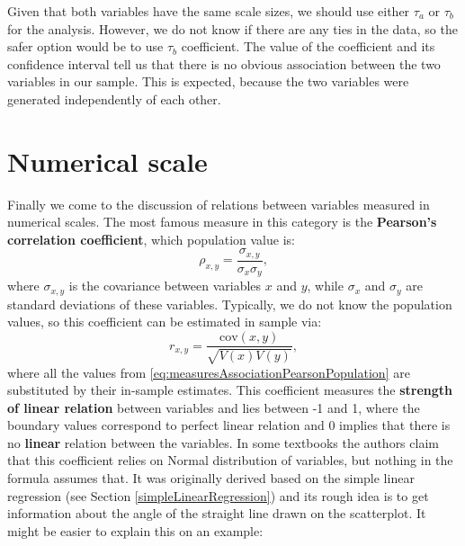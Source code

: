 \documentclass[
]{book}
\newenvironment{Shaded}{\begin{snugshade}}{\end{snugshade}}
\newcommand{\DataTypeTok}[1]{\textcolor[rgb]{0.13,0.29,0.53}{#1}}
\newcommand{\KeywordTok}[1]{\textcolor[rgb]{0.13,0.29,0.53}{\textbf{#1}}}
\newcommand{\NormalTok}[1]{#1}
\newcommand{\OperatorTok}[1]{\textcolor[rgb]{0.81,0.36,0.00}{\textbf{#1}}}
\newcommand{\StringTok}[1]{\textcolor[rgb]{0.31,0.60,0.02}{#1}}
\theoremstyle{definition}
\theoremstyle{definition}
\theoremstyle{definition}
\theoremstyle{definition}
\theoremstyle{remark}
\begin{document}
Given that both variables have the same scale sizes, we should use either \(\tau_a\) or \(\tau_b\) for the analysis. However, we do not know if there are any ties in the data, so the safer option would be to use \(\tau_b\) coefficient. The value of the coefficient and its confidence interval tell us that there is no obvious association between the two variables in our sample. This is expected, because the two variables were generated independently of each other.

\hypertarget{correlationCoefficient}{%
\section{Numerical scale}\label{correlationCoefficient}}

Finally we come to the discussion of relations between variables measured in numerical scales. The most famous measure in this category is the \textbf{Pearson's correlation coefficient}, which population value is:
\begin{equation}
    \rho_{x,y} = \frac{\sigma_{x,y}}{\sigma_x \sigma_y},
    \label{eq:measuresAssociationPearsonPopulation}
\end{equation}
where \(\sigma_{x,y}\) is the covariance between variables \(x\) and \(y\), while \(\sigma_x\) and \(\sigma_y\) are standard deviations of these variables. Typically, we do not know the population values, so this coefficient can be estimated in sample via:
\begin{equation}
    r_{x,y} = \frac{\mathrm{cov}(x,y)}{\sqrt{V(x)V(y)}},
    \label{eq:measuresAssociationPearson}
\end{equation}
where all the values from \eqref{eq:measuresAssociationPearsonPopulation} are substituted by their in-sample estimates. This coefficient measures the \textbf{strength of linear relation} between variables and lies between -1 and 1, where the boundary values correspond to perfect linear relation and 0 implies that there is no \textbf{linear} relation between the variables. In some textbooks the authors claim that this coefficient relies on Normal distribution of variables, but nothing in the formula assumes that. It was originally derived based on the simple linear regression (see Section \ref{simpleLinearRegression}) and its rough idea is to get information about the angle of the straight line drawn on the scatterplot. It might be easier to explain this on an example:

\begin{Shaded}
\end{Shaded}
\end{document}
